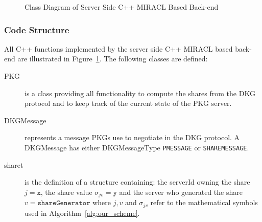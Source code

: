 \begin{figure}
{{

    }}
    \caption{Class Diagram of Server Side C++ MIRACL Based Back-end}
    \label{fig:class_server_side}
\end{figure}

\subsubsection{Code Structure}
All C++ functions implemented by the server side C++ MIRACL based back-end are illustrated in Figure~\ref{fig:class_server_side}. The following classes are defined:
\begin{description}
 \item[PKG] is a class providing all functionality to compute the shares from the DKG protocol and to keep track of the current state of the PKG server.
 \item[DKGMessage] represents a message PKGs use to negotiate in the DKG protocol. A DKGMessage has either DKGMessageType \texttt{P\textunderscore MESSAGE} or \texttt{SHARE\textunderscore MESSAGE}. 
 \item[share\textunderscore t] is the definition of a structure containing: the serverId owning the share $j = \mathtt{x}$, the share value $\sigma_{jv} = \mathtt{y}$ and the server who generated the share $v = \mathtt{shareGenerator}$ where $j,v$ and $\sigma_{jv}$ refer to the mathematical symbols used in Algorithm~\ref{alg:our_scheme}.
\end{description}

